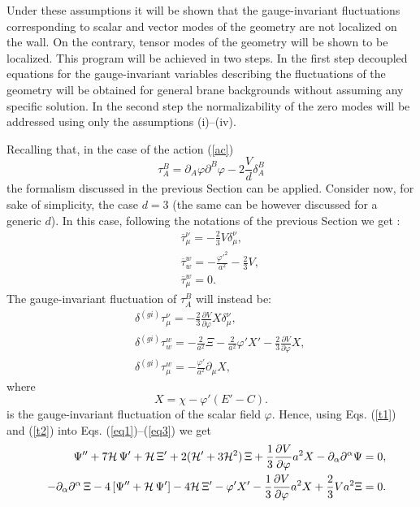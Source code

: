 \documentclass[a4paper,12pt]{article}
\begin{document}
Under these assumptions it will be shown that the gauge-invariant 
fluctuations corresponding to scalar and vector modes of the geometry 
are not localized on the wall. On the contrary, tensor modes of the geometry 
will be shown to be localized. This program will be achieved in two steps. 
In the first step decoupled equations for the gauge-invariant 
variables describing the fluctuations of the geometry will be obtained 
for general brane backgrounds
without assuming any specific solution.
In the second step the normalizability of the zero modes will be  
addressed using only the assumptions (i)--(iv).

Recalling that, in the case of the action (\ref{ac}) 
\begin{equation}
\tau_{A}^{B} = \partial_{A} \varphi \partial^{B} \varphi - 2\frac{V}{d} 
\delta_{A}^{B}
\end{equation}
the formalism discussed in the previous Section can be applied.
Consider now, for sake of simplicity, the case $d=3$ (the same 
can be however discussed for a generic $d$).
In this case, following the notations of the previous Section we get :
\begin{eqnarray}
&&\overline{\tau}_{\mu}^{\nu} = - \frac{2}{3} V \delta _{\mu}^{\nu},
\nonumber\\
&& \overline{\tau}_{w}^{w} = - \frac{{\varphi'}^2 }{a^2 } - \frac{2}{3} V,
\nonumber\\
&& \overline{\tau}_{\mu}^{w} =0.
\label{te1}
\end{eqnarray} 
The gauge-invariant fluctuation  of $\tau_{A}^{B}$ will instead be:
\begin{eqnarray}
&&  \delta^{(gi)} \tau_{\mu}^{\nu} = - \frac{2}{3} \frac{\partial V}{\partial\varphi} X \delta_{\mu}^{\nu},
\nonumber\\
&& \delta^{(gi)} \tau_{w}^{w} = - \frac{2}{a^2} \Xi - \frac{2}{a^2} \varphi' X' - \frac{2}{3} \frac{\partial V}{\partial\varphi} X,
\nonumber\\
&& \delta^{(gi)} \tau_{\mu}^{w} = - \frac{\varphi'}{a^2} \partial_{\mu} X,
\label{te2}
\end{eqnarray}
where 
\begin{equation}
X = \chi - \varphi' (E' -C).
\label{chigi}
\end{equation}
is the gauge-invariant fluctuation of the scalar field $\varphi$.
Hence, using Eqs. (\ref{t1}) and (\ref{t2}) into Eqs. (\ref{eq1})--(\ref{eq3}) 
we get
\begin{eqnarray}
&&\Psi'' + 7 {\cal H} \,\Psi' + {\cal H}\, \Xi' + 
2 ( {\cal H}' + 3 {\cal H}^2)\,\Xi + \frac{1}{3} 
\frac{\partial V}{\partial\varphi} a^2 X - \partial_{\alpha}
\partial^{\alpha} \Psi =0,
\label{ps}\\
&&- \partial_{\alpha}\partial^{\alpha}\,\Xi - 4\, [ \Psi''+ {\cal H}\,\Psi'] - 
4 {\cal H}\, \Xi' - \varphi' X' - \frac{1}{3} 
\frac{\partial V}{\partial\varphi} a^2 X + \frac{2}{3} V a^2 \Xi =0.
\label{xi}
\end{eqnarray}
\end{document}
